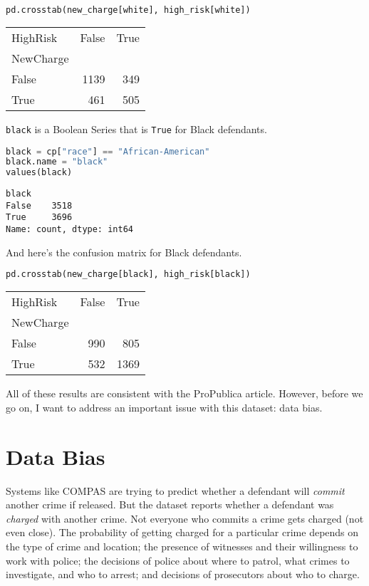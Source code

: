 \begin{lstlisting}[language=Python,style=source]
pd.crosstab(new_charge[white], high_risk[white])
\end{lstlisting}

\begin{tabular}{lrr}
\midrule
HighRisk & False & True \\
NewCharge &  &  \\
\midrule
False & 1139 & 349 \\
True & 461 & 505 \\
\midrule
\end{tabular}

\passthrough{\lstinline!black!} is a Boolean Series that is
\passthrough{\lstinline!True!} for Black defendants.

\begin{lstlisting}[language=Python,style=source]
black = cp["race"] == "African-American"
black.name = "black"
values(black)
\end{lstlisting}

\begin{lstlisting}[style=output]
black
False    3518
True     3696
Name: count, dtype: int64
\end{lstlisting}

And here's the confusion matrix for Black defendants.

\begin{lstlisting}[language=Python,style=source]
pd.crosstab(new_charge[black], high_risk[black])
\end{lstlisting}

\begin{tabular}{lrr}
\midrule
HighRisk & False & True \\
NewCharge &  &  \\
\midrule
False & 990 & 805 \\
True & 532 & 1369 \\
\midrule
\end{tabular}

All of these results are consistent with the ProPublica article.
However, before we go on, I want to address an important issue with this
dataset: data bias.

\section{Data Bias}\label{data-bias}

Systems like COMPAS are trying to predict whether a defendant will
\emph{commit} another crime if released. But the dataset reports whether
a defendant was \emph{charged} with another crime. Not everyone who
commits a crime gets charged (not even close). The probability of
getting charged for a particular crime depends on the type of crime and
location; the presence of witnesses and their willingness to work with
police; the decisions of police about where to patrol, what crimes to
investigate, and who to arrest; and decisions of prosecutors about who
to charge.

